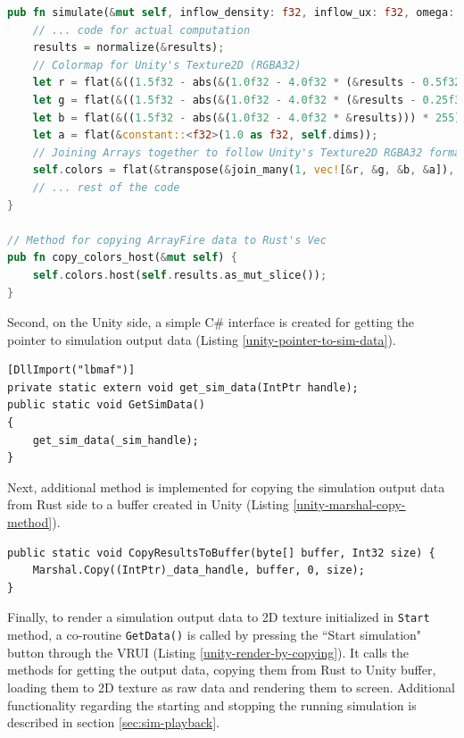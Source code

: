 \begin{lstlisting}[language=Rust, caption=Preparing the data output from Rust side of LBM simulation., label=rust-colors-array]
pub fn simulate(&mut self, inflow_density: f32, inflow_ux: f32, omega: f32) {
	// ... code for actual computation
	results = normalize(&results);
	// Colormap for Unity's Texture2D (RGBA32)
	let r = flat(&((1.5f32 - abs(&(1.0f32 - 4.0f32 * (&results - 0.5f32)))) * 255));
	let g = flat(&((1.5f32 - abs(&(1.0f32 - 4.0f32 * (&results - 0.25f32)))) * 255));
	let b = flat(&((1.5f32 - abs(&(1.0f32 - 4.0f32 * &results))) * 255));
	let a = flat(&constant::<f32>(1.0 as f32, self.dims));
	// Joining Arrays together to follow Unity's Texture2D RGBA32 format
	self.colors = flat(&transpose(&join_many(1, vec![&r, &g, &b, &a]), false)).cast::<u8>();
	// ... rest of the code
}

// Method for copying ArrayFire data to Rust's Vec
pub fn copy_colors_host(&mut self) {
	self.colors.host(self.results.as_mut_slice());
}
\end{lstlisting}

Second, on the Unity side, a simple C\# interface is created for getting the pointer to simulation output data (Listing \ref{unity-pointer-to-sim-data}).

\begin{lstlisting}[language=Csharp, caption=Method for getting the pointer to the memory where simulation output is stored., label=unity-pointer-to-sim-data]
[DllImport("lbmaf")]
private static extern void get_sim_data(IntPtr handle);
public static void GetSimData()
{
	get_sim_data(_sim_handle);
}
\end{lstlisting}

Next, additional method is implemented for copying the simulation output data from Rust side to a buffer created in Unity (Listing \ref{unity-marshal-copy-method}). 

\begin{lstlisting}[language=Csharp, caption=Method for copying simulation output to Unity buffer., label=unity-marshal-copy-method]
public static void CopyResultsToBuffer(byte[] buffer, Int32 size) {
	Marshal.Copy((IntPtr)_data_handle, buffer, 0, size);
}
\end{lstlisting}

Finally, to render a simulation output data to 2D texture initialized in \texttt{Start} method, a co-routine \texttt{GetData()} is called by pressing the ``Start simulation" button through the VRUI (Listing \ref{unity-render-by-copying}). It calls the methods for getting the output data, copying them from Rust to Unity buffer, loading them to 2D texture as raw data and rendering them to screen. Additional functionality regarding the starting and stopping the running simulation is described in section \ref{sec:sim-playback}.

